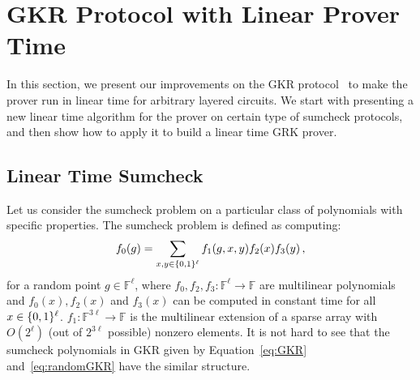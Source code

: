 \section{GKR Protocol with Linear Prover Time}
\label{sec::gkrlin}

In this section, we present our improvements on the GKR protocol~\cite{GKR} to make the prover run in linear time for arbitrary layered circuits. We start with presenting a new linear time algorithm for the prover on certain type of sumcheck protocols, and then show how to apply it to build a linear time GRK prover.

\subsection{Linear Time Sumcheck}

Let us consider the sumcheck problem on a particular class of polynomials with specific properties. The sumcheck problem is defined as computing:
\begin{equation}\label{eq:linearsc}
f_0(g) = \sum\limits_{x,y\in\{0,1\}^\ell}f_1(g,x,y)f_2(x)f_3(y)\, ,
\end{equation}
for a random point $g\in\mathbb{F}^\ell$, where $f_0,f_2,f_3: \mathbb{F}^\ell\rightarrow\mathbb{F}$ are multilinear polynomials and $f_0(x), f_2(x)$ and $f_3(x)$ can be computed in constant time for all $x\in\{0,1\}^\ell$. $f_1:\mathbb{F}^{3\ell}\rightarrow\mathbb{F}$ is the multilinear extension of a sparse array with $O(2^\ell)$ (out of $2^{3\ell}$ possible) nonzero elements. 
It is not hard to see that the sumcheck polynomials in GKR given by Equation~\ref{eq:GKR} and~\ref{eq:randomGKR} have the similar structure.

